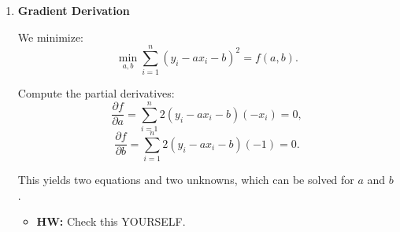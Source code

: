 \begin{example}
\begin{enumerate}
        \item \textbf{Gradient Derivation}
    
        We minimize:
        \[
        \min_{a, b} \sum_{i=1}^n (y_i - ax_i - b)^2 = f(a, b).
        \]
    
        Compute the partial derivatives:
        \[
        \frac{\partial f}{\partial a} = \sum_{i=1}^n 2(y_i - ax_i - b)(-x_i) = 0,
        \]
        \[
        \frac{\partial f}{\partial b} = \sum_{i=1}^n 2(y_i - ax_i - b)(-1) = 0.
        \]
    
        This yields two equations and two unknowns, which can be solved for \( a \) and \( b \).
        \begin{itemize}
            \item \textbf{HW:} Check this YOURSELF.
        \end{itemize}
    \end{enumerate}

\end{example}

